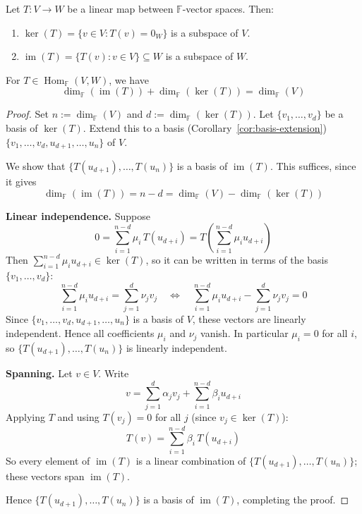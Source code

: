 		\begin{remark}
			Let $T : V \to W$ be a linear map between $\mathbb{F}$-vector spaces. Then:
			\begin{enumerate}[label=\roman*.]
				\item $\ker(T)=\{v\in V : T(v)=0_W\}$ is a subspace of $V$.
				\item $\operatorname{im}(T)=\{T(v):v\in V\}\subseteq W$ is a subspace of $W$.
			\end{enumerate}
		\end{remark}
		
		\begin{theorem}
			\label{thm:rank-nullity}
			For $T \in \operatorname{Hom}_{\mathbb{F}}(V,W)$, we have
			\[
				\dim_{\mathbb{F}}(\operatorname{im}(T)) + \dim_{\mathbb{F}}(\ker(T)) = \dim_{\mathbb{F}}(V)
			\]
		\end{theorem}
		
		\begin{proof}
			Set $n := \dim_{\mathbb{F}}(V)$ and $d := \dim_{\mathbb{F}}(\ker(T))$. Let $\{v_1,\dots,v_d\}$ be a basis of $\ker(T)$. Extend this to a basis (Corollary~\ref{cor:basis-extension}) $\{v_1,\dots,v_d,u_{d+1},\dots,u_n\}$ of $V$.
			
			We show that $\{T(u_{d+1}),\dots,T(u_n)\}$ is a basis of $\operatorname{im}(T)$. This suffices, since it gives
			\[
				\dim_{\mathbb{F}}(\operatorname{im}(T)) = n-d = \dim_{\mathbb{F}}(V) - \dim_{\mathbb{F}}(\ker(T))
			\]
			
			\textbf{Linear independence.} Suppose
			\[
				0 = \sum_{i=1}^{n-d}\mu_i\, T(u_{d+i}) = T\left(\sum_{i=1}^{n-d}\mu_i u_{d+i}\right)
			\]
			Then $\sum_{i=1}^{n-d}\mu_i u_{d+i} \in \ker(T)$, so it can be written in terms of the basis $\{v_1,\dots,v_d\}$:
			\[
				\sum_{i=1}^{n-d}\mu_i u_{d+i} = \sum_{j=1}^{d}\nu_j v_j
				\quad\Longleftrightarrow\quad
				\sum_{i=1}^{n-d}\mu_i u_{d+i} - \sum_{j=1}^{d}\nu_j v_j = 0
			\]
			Since $\{v_1,\dots,v_d,u_{d+1},\dots,u_n\}$ is a basis of $V$, these vectors are linearly independent. Hence all coefficients $\mu_i$ and $\nu_j$ vanish. In particular $\mu_i=0$ for all $i$, so $\{T(u_{d+1}),\dots,T(u_n)\}$ is linearly independent.
			
			\textbf{Spanning.} Let $v\in V$. Write
			\[
				v = \sum_{j=1}^{d}\alpha_j v_j + \sum_{i=1}^{n-d}\beta_i u_{d+i}
			\]
			Applying $T$ and using $T(v_j)=0$ for all $j$ (since $v_j\in\ker(T)$):
			\[
				T(v) = \sum_{i=1}^{n-d}\beta_i\, T(u_{d+i})
			\]
			So every element of $\operatorname{im}(T)$ is a linear combination of $\{T(u_{d+1}),\dots,T(u_n)\}$; these vectors span $\operatorname{im}(T)$.
			
			Hence $\{T(u_{d+1}),\dots,T(u_n)\}$ is a basis of $\operatorname{im}(T)$, completing the proof.
		\end{proof}
	
